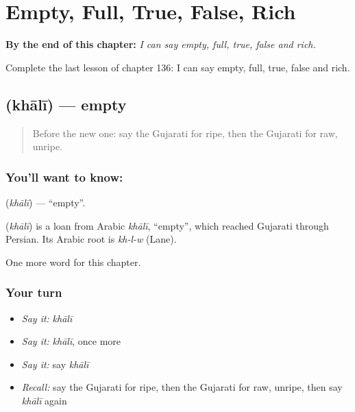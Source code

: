 
\chapter{Empty, Full, True, False, Rich}
\label{ch:gu-empty-full-true-false-rich}

\begin{chapteropening}
\textbf{By the end of this chapter:} \emph{I can say empty, full, true, false and rich.}

Complete the last lesson of chapter 136: I can say empty, full, true, false and rich.
\end{chapteropening}

\section[\texorpdfstring{\gu{ખાલી} (khālī)}{ખાલી (khālī)}]{ (khālī) — empty}

\label{lesson:GU-C136-khali}



\begin{quote}
Before the new one: say the Gujarati for ripe, then the Gujarati for raw, unripe.
\end{quote}

\subsection*{You'll want to know: }
\textbf{} (\emph{khālī}) — \textquotedblleft{}empty\textquotedblright{}.

\begin{cousinweb}
\textbf{} (\emph{khālī}) is a loan from Arabic \emph{khālī}, \textquotedblleft{}empty\textquotedblright{}, which reached Gujarati through Persian. Its Arabic root is \emph{kh-l-w} (Lane).
\end{cousinweb}

\begin{grammarlens}[title={What you've built}]
One more word for this chapter.
\end{grammarlens}

\subsection*{Your turn}
\begin{itemize}
\raggedright
  \item \emph{Say it:} \emph{khālī}
  \item \emph{Say it:} \emph{khālī}, once more
  \item \emph{Say it:} say \emph{khālī}
  \item \emph{Recall:} say the Gujarati for ripe, then the Gujarati for raw, unripe, then say \emph{khālī} again
\end{itemize}

